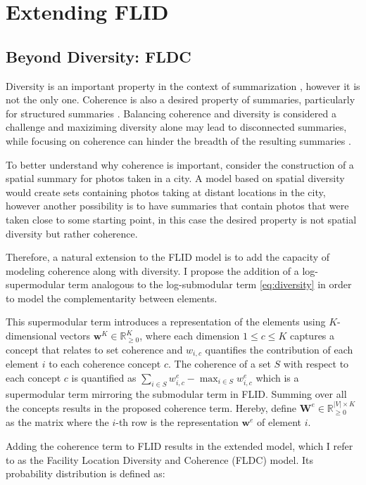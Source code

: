 \chapter{Extending FLID}
\label{sec:models}

\section{Beyond Diversity: FLDC}

Diversity is an important property in the context of summarization \citep{tschiatschek16learning}, however it is not the only one. Coherence is also a desired property of summaries, particularly for structured summaries \citep{Yan:2011:ETS:2009916.2010016}. Balancing coherence and diversity is considered a challenge and maxiziming diversity alone may lead to disconnected summaries, while focusing on coherence can hinder the breadth of the resulting summaries \citep{Shahaf2012}.

To better understand why coherence is important, consider the construction of a spatial summary for photos taken in a city. A model based on spatial diversity would create sets containing photos taking at distant locations in the city, however another possibility is to have summaries that contain photos that were taken close to some starting point, in this case the desired property is not spatial diversity but rather coherence.

Therefore, a natural extension to the FLID model is to add the capacity of modeling coherence along with diversity. I propose the addition of a log-supermodular term analogous to the log-submodular term \eqref{eq:diversity} in order to model the complementarity between elements.

This supermodular term introduces a representation of the elements using $K$-dimensional vectors $\mathbf{w}^{K} \in \mathbb{R}^{K}_{\geq 0}$, where each dimension $1 \leq c \leq K$ captures a concept that relates to set coherence and $w_{i,c}$ quantifies the contribution of each element $i$ to each coherence concept $c$. The coherence of a set $S$ with respect to each concept $c$ is quantified as $\sum_{i \in S}{w^{e}_{i,c}} - \max_{i \in S}{w^{e}_{i,c}}$ which is a supermodular term mirroring the submodular term in FLID. Summing over all the concepts results in the proposed coherence term. Hereby, define $\mathbf{W}^{e} \in \mathbb{R}^{|V| \times K}_{\geq 0}$ as the matrix where the $i$-th row is the representation $\mathbf{w}^{e}$ of element $i$.

Adding the coherence term to FLID results in the extended model, which I refer to as the Facility Location Diversity and Coherence (FLDC) model. Its probability distribution is defined as:

